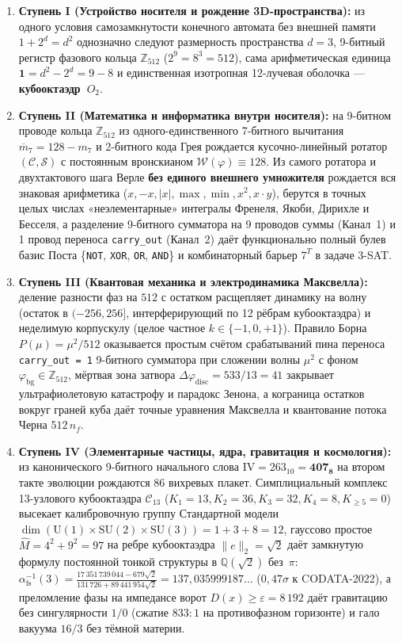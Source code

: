\begin{enumerate}[leftmargin=*]
\item \textbf{Ступень I (Устройство носителя и рождение 3D-пространства):}
  из одного условия самозамкнутости конечного автомата без внешней памяти $1 + 2^d = d^2$ однозначно следуют размерность пространства $d = 3$, 9-битный регистр фазового кольца $\mathbb{Z}_{512}$ ($2^9 = 8^3 = 512$), сама арифметическая единица $\mathbf{1} = d^2 - 2^d = 9 - 8$ и единственная изотропная 12-лучевая оболочка --- \textbf{кубооктаэдр~$O_2$}.
\item \textbf{Ступень II (Математика и информатика внутри носителя):}
  на 9-битном проводе кольца $\mathbb{Z}_{512}$ из одного-единственного 7-битного вычитания $\overline{m}_7 = 128 - m_7$ и 2-битного кода Грея рождается кусочно-линейный ротатор $(\mathcal{C},\mathcal{S})$ с постоянным вронскианом $\mathcal{W}(\varphi)\equiv 128$. Из самого ротатора и двухтактового шага Верле \textbf{без единого внешнего умножителя} рождается вся знаковая арифметика ($x, -x, |x|, \max, \min, x^2, x\cdot y$), берутся в точных целых числах «неэлементарные» интегралы Френеля, Якоби, Дирихле и Бесселя, а разделение 9-битного сумматора на 9 проводов суммы (Канал~1) и 1 провод переноса \texttt{carry\_out} (Канал~2) даёт функционально полный булев базис Поста \{\texttt{NOT}, \texttt{XOR}, \texttt{OR}, \texttt{AND}\} и комбинаторный барьер $7^T$ в задаче 3-SAT.
\item \textbf{Ступень III (Квантовая механика и электродинамика Максвелла):}
  деление разности фаз на $512$ с остатком расщепляет динамику на волну (остаток в $(-256,256]$, интерферирующий по 12 рёбрам кубооктаэдра) и неделимую корпускулу (целое частное $k\in\{-1,0,+1\}$). Правило Борна $P(\mu)=\mu^2/512$ оказывается простым счётом срабатываний пина переноса \texttt{carry\_out = 1} 9-битного сумматора при сложении волны $\mu^2$ с фоном $\varphi_{\mathrm{bg}}\in\mathbb{Z}_{512}$, мёртвая зона затвора $\Delta\varphi_{\mathrm{disc}} = 533 / 13 = 41$ закрывает ультрафиолетовую катастрофу и парадокс Зенона, а кограница остатков вокруг граней куба даёт точные уравнения Максвелла и квантование потока Черна $512\,n_f$.
\item \textbf{Ступень IV (Элементарные частицы, ядра, гравитация и космология):}
  из канонического 9-битного начального слова $\mathrm{IV} = 263_{10} = \mathbf{407_8}$ на втором такте эволюции рождаются 86 вихревых плакет. Симплициальный комплекс 13-узлового кубооктаэдра $\mathcal{C}_{13}$ ($K_1=13, K_2=36, K_3=32, K_4=8, K_{\ge 5}=0$) высекает калибровочную группу Стандартной модели $\dim(\mathrm{U}(1)\times\mathrm{SU}(2)\times\mathrm{SU}(3)) = 1 + 3 + 8 = 12$, гауссово простое $\hat{M} = 4^2 + 9^2 = 97$ на ребре кубооктаэдра $\|e\|_2 = \sqrt{2}$ даёт замкнутую формулу постоянной тонкой структуры в $\mathbb{Q}(\sqrt{2})$ без~$\pi$: $\alpha_{\mathrm{fs}}^{-1}(3) = \frac{17\,351\,739\,044 - 679\sqrt{2}}{131\,726 + 89\,441\,954\sqrt{2}} = 137{,}035999187\dots$ ($0{,}47\sigma$ к CODATA-2022), а преломление фазы на импедансе ворот $D(x)\ge\varepsilon = 8\,192$ даёт гравитацию без сингулярности $1/0$ (сжатие $833:1$ на противофазном горизонте) и гало вакуума $16/3$ без тёмной материи.

\end{enumerate}

